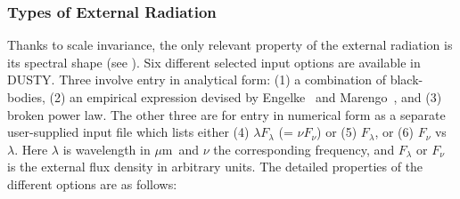 \documentclass[11pt]{article}
\def\D  {{\sf DUSTY}}
\def\mic    {\hbox{$\mu$m}}
\begin{document}
\subsubsection{Types of External Radiation}
\label{type_raiation}
%
Thanks to scale invariance, the only relevant property of the external
radiation is its spectral shape (see \cite{IE97}). Six different selected input
options are available in \D. Three involve entry in analytical form: (1) a
combination of black-bodies, (2) an empirical expression devised by
Engelke~\cite{Engelk} and Marengo~\cite{Mareng}, and (3) broken power law. The
other three are for entry in numerical form as a separate user-supplied input
file which lists either (4) $\lambda F_\lambda$ (= $\nu F_\nu$) or (5)
$F_\lambda$, or (6) $F_\nu$ vs $\lambda$.  Here $\lambda$ is wavelength in
\mic\ and $\nu$ the corresponding frequency, and $F_\lambda$ or $F_\nu$ is the
external flux density in arbitrary units. The detailed properties of the
different options are as follows:
\end{document}
